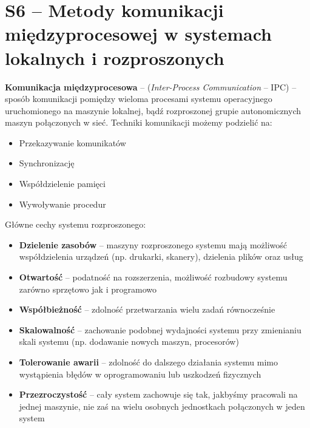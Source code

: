 \section{S6 -- Metody komunikacji międzyprocesowej w systemach lokalnych i rozproszonych}

\textbf{Komunikacja międzyprocesowa} -- (\textit{Inter-Process Communication} -- IPC) -- sposób komunikacji pomiędzy wieloma procesami systemu operacyjnego uruchomionego na maszynie lokalnej, bądź rozproszonej grupie autonomicznych maszyn połączonych w sieć. Techniki komunikacji możemy podzielić na:
\begin{itemize}
	\item Przekazywanie komunikatów
    \item Synchronizację
    \item Współdzielenie pamięci
    \item Wywoływanie procedur
\end{itemize}

Główne cechy systemu rozproszonego:
\begin{itemize}
	\item \textbf{Dzielenie zasobów} -- maszyny rozproszonego systemu mają możliwość współdzielenia urządzeń (np. drukarki, skanery), dzielenia plików oraz usług
    \item \textbf{Otwartość} -- podatność na rozszerzenia, możliwość rozbudowy systemu zarówno sprzętowo jak i programowo
    \item \textbf{Współbieżność} -- zdolność przetwarzania wielu zadań równocześnie
    \item \textbf{Skalowalność} -- zachowanie podobnej wydajności systemu przy zmienianiu skali systemu (np. dodawanie nowych maszyn, procesorów)
    \item \textbf{Tolerowanie awarii} -- zdolność do dalszego działania systemu mimo wystąpienia błędów w oprogramowaniu lub uszkodzeń fizycznych
    \item \textbf{Przezroczystość} -- cały system zachowuje się tak, jakbyśmy pracowali na jednej maszynie, nie zaś na wielu osobnych jednostkach połączonych w jeden system
\end{itemize}

